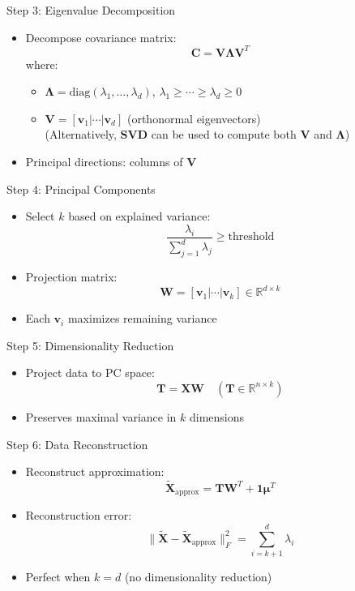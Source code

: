 \documentclass{beamer}
\begin{document}
\begin{frame}{Step 3: Eigenvalue Decomposition}
\begin{itemize}
\item Decompose covariance matrix:
\[
\mathbf{C} = \mathbf{V}\boldsymbol{\Lambda}\mathbf{V}^T
\]
where:
\begin{itemize}
\item $\boldsymbol{\Lambda} = \text{diag}(\lambda_1, \dots, \lambda_d)$, $\lambda_1 \geq \cdots \geq \lambda_d \geq 0$
\item $\mathbf{V} = [\mathbf{v}_1 | \cdots | \mathbf{v}_d]$ (orthonormal eigenvectors) \\
(Alternatively, \textbf{SVD} can be used to compute both $\mathbf{V}$ and $\boldsymbol{\Lambda}$)
\end{itemize}
\item Principal directions: columns of $\mathbf{V}$
\end{itemize}
\end{frame}

\begin{frame}{Step 4: Principal Components}
\begin{itemize}
\item Select $k$ based on explained variance:
\[
\frac{\lambda_i}{\sum_{j=1}^d \lambda_j} \geq \text{threshold}
\]
\item Projection matrix:
\[
\mathbf{W} = [\mathbf{v}_1 | \cdots | \mathbf{v}_k] \in \mathbb{R}^{d \times k}
\]
\item Each $\mathbf{v}_i$ maximizes remaining variance
\end{itemize}
\end{frame}

\begin{frame}{Step 5: Dimensionality Reduction}
\begin{itemize}
\item Project data to PC space:
\[
\mathbf{T} = \mathbf{X}\mathbf{W} \quad (\mathbf{T} \in \mathbb{R}^{n \times k})
\]
\item Preserves maximal variance in $k$ dimensions
\end{itemize}
\end{frame}

\begin{frame}{Step 6: Data Reconstruction}
\begin{itemize}
\item Reconstruct approximation:
\[
\mathbf{\tilde{X}}_{\text{approx}} = \mathbf{T}\mathbf{W}^T + \mathbf{1}\boldsymbol{\mu}^T
\]
\item Reconstruction error:
\[
\|\mathbf{\tilde{X}} - \mathbf{\tilde{X}}_{\text{approx}}\|_F^2 = \sum_{i=k+1}^d \lambda_i
\]
\item Perfect when $k = d$ (no dimensionality reduction)
\end{itemize}
\end{frame}
\end{document}
